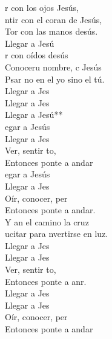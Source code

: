 \begin{cancion}%
	r con los ojos Jesús,\\
	ntir con el coran de Jesús,\\
	Tor con las manos desús.\\
	Llegar a Jesú   \\
	r con oídos desús \\
	Conoceru nombre, c Jesús\\
	Psar no en el yo sino el tú.\\
	Llegar a Jes \\
	Llegar a Jes\\
	Llegar a Jesú**\\
\jump
	egar a Jesús\\
	Llegar a Jes\\
	Ver, sentir to,    \\
	Entonces ponte a andar\\
	egar a Jesús\\
	Llegar a Jes\\
	Oír, conocer, per   \\
	Entonces ponte a andar.\\
	Y an el camino  la cruz\\
	ucitar para nvertirse en luz.\\
	Llegar a Jes \\
	Llegar a Jes\\
	Ver, sentir to,    \\
	Entonces ponte a anr.\\
	Llegar a Jes \\
	Llegar a Jes\\
	Oír, conocer, per   \\
	Entonces ponte a andar\\
\end{cancion}%

